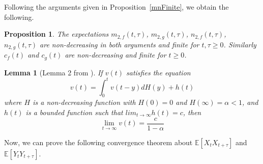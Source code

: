 \documentclass[12pt]{amsart}
\theoremstyle{plain}
\newtheorem{prop}[thm]{Proposition}
\newtheorem{lemma}[thm]{Lemma}
\theoremstyle{definition}
\theoremstyle{remark}
\theoremstyle{definition}
\begin{document}
Following the arguments given in Proposition~\ref{mnFinite}, we obtain the following.

\begin{prop}
The expectations $m_{2,f}(t,\tau)$, $m_{2,g}(t,\tau)$, $n_{2,f}(t,\tau)$, $n_{2,g}(t,\tau)$ are non-decreasing in both arguments and finite for $t, \tau \geq 0$.  Similarly $c_f(t)$ and $c_g(t)$ are non-decreasing and finite for $t \ge 0$.
\end{prop}

\begin{lemma}[Lemma 2 from \cite{bellmanHarris}] \label{int-limit}
If $v(t)$ satisfies the equation
\begin{equation}
v(t) = \int_0^t v(t-y) dH(y) + h(t)
\end{equation}
where $H$ is a non-decreasing function with $H(0) = 0$ and $H(\infty) = \alpha < 1$, and $h(t)$ is a bounded function such that $lim_{t\to\infty} h(t) = c$, then
\begin{equation}
\lim_{t\to\infty} v(t) = \frac{c}{1-\alpha}
\end{equation}
\end{lemma}

Now, we can prove the following convergence theorem about $\mathbb{E}[X_t X_{t+\tau}]$ and $\mathbb{E}[Y_t Y_{t+\tau}]$.
\end{document}
